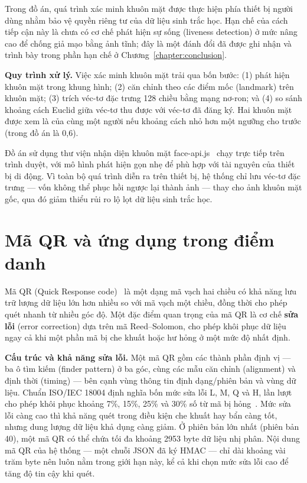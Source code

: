 \documentclass[../main.tex]{subfiles}
\begin{document}
Trong đồ án, quá trình xác minh khuôn mặt được thực hiện phía thiết bị người dùng nhằm
bảo vệ quyền riêng tư của dữ liệu sinh trắc học. Hạn chế của cách tiếp cận này là chưa có
cơ chế phát hiện sự sống (liveness detection) ở mức nâng cao để chống giả mạo bằng ảnh
tĩnh; đây là một đánh đổi đã được ghi nhận và trình bày trong phần hạn chế ở
Chương~\ref{chapter:conclusion}.

\textbf{Quy trình xử lý.} Việc xác minh khuôn mặt trải qua bốn bước: (1) phát hiện khuôn mặt
trong khung hình; (2) căn chỉnh theo các điểm mốc (landmark) trên khuôn mặt; (3) trích véc-tơ
đặc trưng 128 chiều bằng mạng nơ-ron; và (4) so sánh khoảng cách Euclid giữa véc-tơ thu được
với véc-tơ đã đăng ký. Hai khuôn mặt được xem là của cùng một người nếu khoảng cách nhỏ hơn
một ngưỡng cho trước (trong đồ án là 0,6).

Đồ án sử dụng thư viện nhận diện khuôn mặt face-api.js~\cite{faceapijs} chạy trực tiếp trên
trình duyệt, với mô hình phát hiện gọn nhẹ để phù hợp với tài nguyên của thiết bị di động. Vì toàn bộ quá trình diễn
ra trên thiết bị, hệ thống chỉ lưu véc-tơ đặc trưng --- vốn không thể phục hồi ngược lại thành
ảnh --- thay cho ảnh khuôn mặt gốc, qua đó giảm thiểu rủi ro lộ lọt dữ liệu sinh trắc học.

\section{Mã QR và ứng dụng trong điểm danh}
\label{sec:qrcode}

Mã QR (Quick Response code)~\cite{iso18004} là một dạng mã vạch hai chiều có khả năng lưu trữ
lượng dữ liệu lớn hơn nhiều so với mã vạch một chiều, đồng thời cho phép quét nhanh từ nhiều
góc độ. Một đặc
điểm quan trọng của mã QR là cơ chế \textbf{sửa lỗi} (error correction) dựa trên mã
Reed--Solomon, cho phép khôi phục dữ liệu ngay cả khi một phần mã bị che khuất hoặc hư hỏng ở
một mức độ nhất định.

\textbf{Cấu trúc và khả năng sửa lỗi.} Một mã QR gồm các thành phần định vị --- ba ô tìm kiếm
(finder pattern) ở ba góc, cùng các mẫu căn chỉnh (alignment) và định thời (timing) --- bên
cạnh vùng thông tin định dạng/phiên bản và vùng dữ liệu. Chuẩn ISO/IEC 18004 định nghĩa bốn
mức sửa lỗi L, M, Q và H, lần lượt cho phép khôi phục khoảng 7\%, 15\%, 25\% và 30\% số từ mã
bị hỏng~\cite{iso18004}. Mức sửa lỗi càng cao thì khả năng quét trong điều kiện che khuất hay
bẩn càng tốt, nhưng dung lượng dữ liệu khả dụng càng giảm. Ở phiên bản lớn nhất (phiên bản 40),
một mã QR có thể chứa tối đa khoảng 2953 byte dữ liệu nhị phân. Nội dung mã QR của hệ thống ---
một chuỗi JSON đã ký HMAC --- chỉ dài khoảng vài trăm byte nên luôn nằm trong giới hạn này, kể
cả khi chọn mức sửa lỗi cao để tăng độ tin cậy khi quét.
\end{document}
